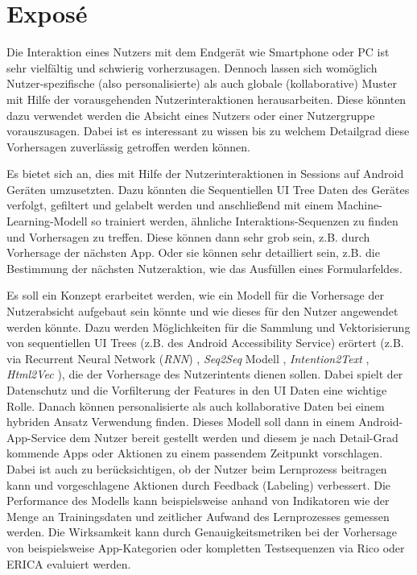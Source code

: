 \section*{Exposé}
\label{sec:abstract}

Die Interaktion eines Nutzers mit dem Endgerät wie Smartphone oder PC ist sehr vielfältig und schwierig vorherzusagen. Dennoch lassen sich womöglich Nutzer-spezifische (also personalisierte) als auch globale (kollaborative) Muster mit Hilfe der vorausgehenden Nutzerinteraktionen herausarbeiten. Diese könnten dazu verwendet werden die Absicht eines Nutzers oder einer Nutzergruppe vorauszusagen. Dabei ist es interessant zu wissen bis zu welchem Detailgrad diese Vorhersagen zuverlässig getroffen werden können.

Es bietet sich an, dies mit Hilfe der Nutzerinteraktionen in Sessions auf Android Geräten umzusetzten. Dazu könnten die Sequentiellen UI Tree Daten des Gerätes verfolgt, gefiltert und gelabelt werden und anschließend mit einem Machine-Learning-Modell so trainiert werden, ähnliche Interaktions-Sequenzen zu finden und Vorhersagen zu treffen. Diese können dann sehr grob sein, z.B. durch Vorhersage der nächsten App. Oder sie können sehr detailliert sein, z.B. die Bestimmung der nächsten Nutzeraktion, wie das Ausfüllen eines Formularfeldes.

Es soll ein Konzept erarbeitet werden, wie ein Modell für die Vorhersage der Nutzerabsicht aufgebaut sein könnte und wie dieses für den Nutzer angewendet werden könnte. Dazu werden Möglichkeiten für die Sammlung und Vektorisierung von sequentiellen UI Trees (z.B. des Android Accessibility Service) erörtert (z.B. via Recurrent Neural Network (\textit{RNN}) \cite{quadrana2017personalizing} \cite{bansal2022remembering} \cite{pietro2022recommendationSystems}, \textit{Seq2Seq} Modell \cite{chollet2017seq2seq}, \textit{Intention2Text} \cite{yu2020understanding}, \textit{Html2Vec} \cite{wu2022distributed}), die der Vorhersage des Nutzerintents dienen sollen. Dabei spielt der Datenschutz und die Vorfilterung der Features in den UI Daten eine wichtige Rolle. Danach können personalisierte als auch kollaborative Daten bei einem hybriden Ansatz Verwendung finden. Dieses Modell soll dann in einem Android-App-Service dem Nutzer bereit gestellt werden und diesem je nach Detail-Grad kommende Apps oder Aktionen zu einem passendem Zeitpunkt vorschlagen. Dabei ist auch zu berücksichtigen, ob der Nutzer beim Lernprozess beitragen kann und vorgeschlagene Aktionen durch Feedback (Labeling) verbessert.
Die Performance des Modells kann beispielsweise anhand von Indikatoren wie der Menge an Trainingsdaten und zeitlicher Aufwand des Lernprozesses gemessen werden. Die Wirksamkeit kann durch Genauigkeitsmetriken bei der Vorhersage von beispielsweise App-Kategorien \cite{google2023appCategory} oder kompletten Testsequenzen via Rico \cite{deka2017rico} oder ERICA \cite{deka2016erica} evaluiert werden.

